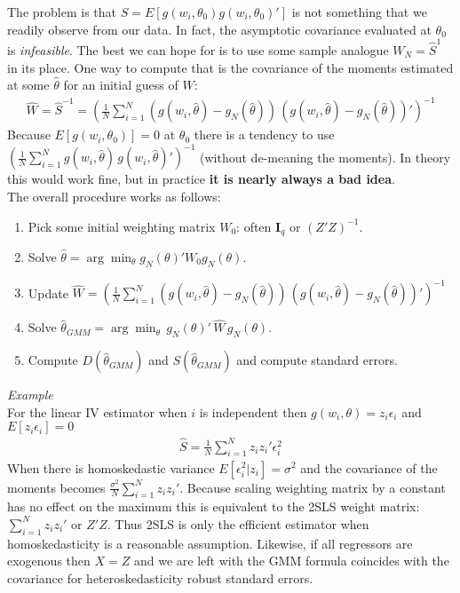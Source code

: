 \documentclass[a4paper]{article}
\begin{document}
The problem is that $S = E[g(w_i,\theta_0) g(w_i,\theta_0)']$ is not something that we readily observe from our data. In fact, the asymptotic covariance evaluated at $\theta_0$ is \textit{infeasible}. The best we can hope for is to use some sample analogue $W_N=\hat{S}^{1}$ in its place. One way to compute that is the covariance of the moments estimated at some $\hat{\theta}$ for an initial guess of $W$:
\begin{eqnarray*}
\hat{W} = \hat{S}^{-1} = \left(\frac{1}{N} \sum_{i=1}^N (g(w_i,\hat{\theta}) - g_N(\hat{\theta}))  \, (g(w_i,\hat{\theta}) - g_N(\hat{\theta}))'\right)^{-1}
\end{eqnarray*}
Because $E[g(w_i,\theta_0)]=0$ at $\theta_0$ there is a tendency to use $\left(\frac{1}{N} \sum_{i=1}^N g(w_i,\hat{\theta}) \, g(w_i,\hat{\theta} )'\right)^{-1}$ (without de-meaning the moments). In theory this would work fine, but in practice \textbf{it is nearly always a bad idea}.\\

\noindent The overall procedure works as follows:
\begin{enumerate}
\item Pick some initial weighting matrix $W_0$: often $\mathbf{I}_q$ or $(Z'Z)^{-1}$.
\item Solve $\hat{\theta} = \arg \min_{\theta} g_N(\theta)' W_0  g_N(\theta)$.
\item Update $\hat{W} = \left(\frac{1}{N} \sum_{i=1}^N (g(w_i,\hat{\theta}) - g_N(\hat{\theta}))  \, (g(w_i,\hat{\theta}) - g_N(\hat{\theta}))'\right)^{-1}$
\item Solve $\hat{\theta}_{GMM} = \arg \min_{\theta}\, g_N(\theta)' \, \hat{W} \, g_N(\theta)$.
\item Compute $D(\hat{\theta}_{GMM})$ and $S(\hat{\theta}_{GMM})$ and compute standard errors.
\end{enumerate}

\noindent \textit{Example}\\

For the linear IV estimator when $i$ is independent then $g(w_i,\theta) = z_i \epsilon_i$ and $E[z_i \epsilon_i]=0$
\begin{eqnarray*}
\hat{S}=\frac{1}{N} \sum_{i=1}^N z_i z_i' \epsilon_i^2
\end{eqnarray*}
When there is homoskedastic variance $E[\epsilon_i^2 | z_i] = \sigma^2$ and the covariance of the moments becomes $\frac{\sigma^2}{N} \sum_{i=1}^N z_i z_i'$. Because scaling weighting matrix by a constant has no effect on the maximum this is equivalent to the 2SLS weight matrix: $\sum_{i=1}^N z_i z_i'$ or $Z'Z$. Thus 2SLS is only the efficient estimator when homoskedasticity is a reasonable assumption. Likewise, if all regressors are exogenous then $X=Z$ and we are left with the GMM formula coincides with the covariance for heteroskedasticity robust standard errors.
\end{document}
